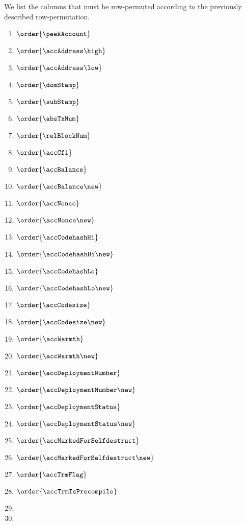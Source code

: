 We list the columns that must be row-permuted according to the previously described row-permutation.
\begin{multicols}{3}
	\begin{enumerate}
		\item $\order{\peekAccount}$
		\item $\order{\accAddress\high}$
		\item $\order{\accAddress\low}$
		\item $\order{\domStamp}$
		\item $\order{\subStamp}$
		\item $\order{\absTxNum}$
		\item $\order{\relBlockNum}$
		\item $\order{\accCfi}$
		\item $\order{\accBalance}$
		\item $\order{\accBalance\new}$
		\item $\order{\accNonce}$
		\item $\order{\accNonce\new}$
		\item $\order{\accCodehashHi}$
		\item $\order{\accCodehashHi\new}$
		\item $\order{\accCodehashLo}$
		\item $\order{\accCodehashLo\new}$
		\item $\order{\accCodesize}$
		\item $\order{\accCodesize\new}$
		\item $\order{\accWarmth}$
		\item $\order{\accWarmth\new}$
		\item $\order{\accDeploymentNumber}$
		\item $\order{\accDeploymentNumber\new}$
		\item $\order{\accDeploymentStatus}$
		\item $\order{\accDeploymentStatus\new}$
		\item $\order{\accMarkedForSelfdestruct}$
		\item $\order{\accMarkedForSelfdestruct\new}$
		\item $\order{\accTrmFlag}$
		\item $\order{\accTrmIsPrecompile}$
		\item[\vspace{\fill}]
		\item[\vspace{\fill}]
	\end{enumerate}
\end{multicols}
